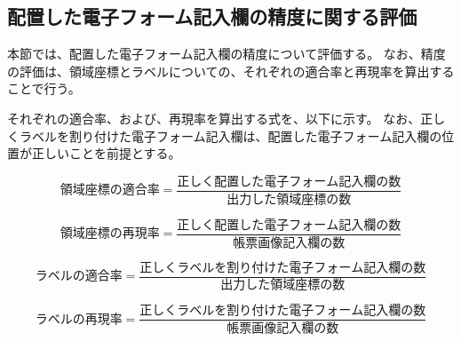 




\subsection{配置した電子フォーム記入欄の精度に関する評価}\label{subsec:evalue_accuracy}
本節では、配置した電子フォーム記入欄の精度について評価する。
なお、精度の評価は、領域座標とラベルについての、それぞれの適合率と再現率を算出することで行う。

それぞれの適合率、および、再現率を算出する式を、以下に示す。
なお、正しくラベルを割り付けた電子フォーム記入欄は、配置した電子フォーム記入欄の位置が正しいことを前提とする。

\begin{equation}
    領域座標の適合率=\frac{正しく配置した電子フォーム記入欄の数}{出力した領域座標の数}
\end{equation}

\begin{equation}
    領域座標の再現率=\frac{正しく配置した電子フォーム記入欄の数}{帳票画像記入欄の数}
\end{equation}

\begin{equation}
    ラベルの適合率=\frac{正しくラベルを割り付けた電子フォーム記入欄の数}{出力した領域座標の数}
\end{equation}

\begin{equation}
    ラベルの再現率=\frac{正しくラベルを割り付けた電子フォーム記入欄の数}{帳票画像記入欄の数}
\end{equation}

